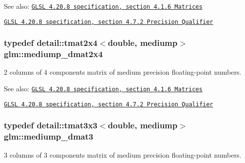 \begin{Desc}
\item[See also:]\href{http://www.opengl.org/registry/doc/GLSLangSpec.4.20.8.pdf}{\tt GLSL 4.20.8 specification, section 4.1.6 Matrices} 

\href{http://www.opengl.org/registry/doc/GLSLangSpec.4.20.8.pdf}{\tt GLSL 4.20.8 specification, section 4.7.2 Precision Qualifier} \end{Desc}
\hypertarget{group__core__precision_gdb60bf60ef2b8da4a28a372b2bcca3a3}{
\subsubsection[mediump\_\-dmat2x4]{\setlength{\rightskip}{0pt plus 5cm}typedef detail::tmat2x4$<$double, mediump$>$ {\bf glm::mediump\_\-dmat2x4}}}
\label{group__core__precision_gdb60bf60ef2b8da4a28a372b2bcca3a3}


2 columns of 4 components matrix of medium precision floating-point numbers.

\begin{Desc}
\item[See also:]\href{http://www.opengl.org/registry/doc/GLSLangSpec.4.20.8.pdf}{\tt GLSL 4.20.8 specification, section 4.1.6 Matrices} 

\href{http://www.opengl.org/registry/doc/GLSLangSpec.4.20.8.pdf}{\tt GLSL 4.20.8 specification, section 4.7.2 Precision Qualifier} \end{Desc}
\hypertarget{group__core__precision_g80600af2c1ca11ead6123777185c372d}{
\subsubsection[mediump\_\-dmat3]{\setlength{\rightskip}{0pt plus 5cm}typedef detail::tmat3x3$<$double, mediump$>$ {\bf glm::mediump\_\-dmat3}}}
\label{group__core__precision_g80600af2c1ca11ead6123777185c372d}


3 columns of 3 components matrix of medium precision floating-point numbers.

